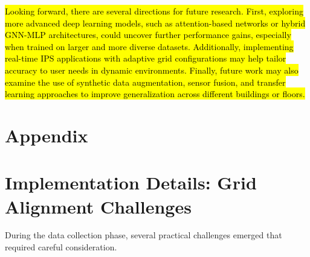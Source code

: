 \documentclass[runningheads]{llncs}
\newcommand{\hlred}[1]{\sethlcolor{lightred}\hl{#1}}
\begin{document}
\hlred{Looking forward, there are several directions for future research. First, exploring more advanced deep learning models, such as attention-based networks or hybrid GNN-MLP architectures, could uncover further performance gains, especially when trained on larger and more diverse datasets. Additionally, implementing real-time IPS applications with adaptive grid configurations may help tailor accuracy to user needs in dynamic environments. Finally, future work may also examine the use of synthetic data augmentation, sensor fusion, and transfer learning approaches to improve generalization across different buildings or floors.}

%
%



\newpage

\appendix

\section*{Appendix}

\section{Implementation Details: Grid Alignment Challenges}

During the data collection phase, several practical challenges emerged that required careful consideration.
\end{document}
